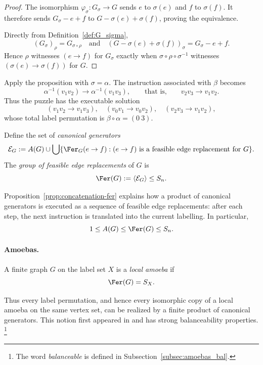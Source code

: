 \begin{proof}
    The isomorphism $\varphi_\sigma\colon G_\sigma\to G$ sends $e$ to $\sigma(e)$ and $f$ to $\sigma(f)$.
    It therefore sends $G_\sigma-e+f$ to $G-\sigma(e)+\sigma(f)$, proving the equivalence.

    Directly from Definition~\ref{def:G_sigma},
    \[
        (G_\sigma)_\rho=G_{\sigma\circ\rho}
        \quad\text{and}\quad
        (G-\sigma(e)+\sigma(f))_\sigma=G_\sigma-e+f.
    \]
    Hence $\rho$ witnesses $(e\to f)$ for $G_\sigma$ exactly when
    $\sigma\circ\rho\circ\sigma^{-1}$ witnesses $(\sigma(e)\to\sigma(f))$ for $G$.
\end{proof}

Apply the proposition with $\sigma=\alpha$.
The instruction associated with $\beta$ becomes
\[
    \alpha^{-1}(v_1v_2)\to\alpha^{-1}(v_1v_3),
    \qquad\text{that is,}\qquad
    v_2v_3\to v_1v_2.
\]
Thus the puzzle has the executable solution
\[
    (v_1v_2\to v_1v_3),\quad
    (v_0v_1\to v_0v_2),\quad
    (v_2v_3\to v_1v_2),
\]
whose total label permutation is $\beta\circ\alpha=(0\ 3)$.

\begin{definition}\label{def:fer-group}
    Define the set of \emph{canonical generators}
    \[
        \mathcal E_G
        :=A(G)\cup
        \bigcup\{\Fer_G(e\to f):(e\to f)\text{ is a feasible edge replacement for }G\}.
    \]
    The \emph{group of feasible edge replacements} of $G$ is
    \[
        \Fer(G):=\langle\mathcal E_G\rangle\leq S_n.
    \]
\end{definition}

Proposition~\ref{prop:concatenation-fer} explains how a product of canonical generators is executed as a sequence of feasible edge replacements: after each step, the next instruction is translated into the current labelling.
In particular,
\[
    1\leq A(G)\leq\Fer(G)\leq S_n.
\]

\paragraph{Amoebas.}

\begin{definition}\label{def:local_amoeba}
    A finite graph $G$ on the label set $X$ is a \emph{local amoeba} if
    \[
        \Fer(G)=S_X.
    \]
\end{definition}

Thus every label permutation, and hence every isomorphic copy of a local amoeba on the same vertex set, can be realized by a finite product of canonical generators.
This notion first appeared in \cite{unavoidable_chromatic} and has strong balanceability properties.%
\footnote{The word \emph{balanceable} is defined in Subsection~\ref{subsec:amoebas_bal}.}

